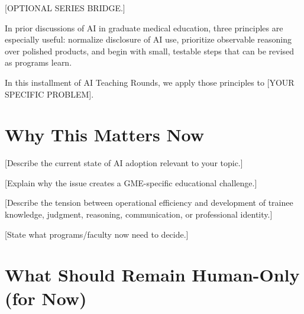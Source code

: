 \documentclass[12pt]{article}
\begin{document}
 [OPTIONAL SERIES BRIDGE.]

In prior discussions of AI in graduate medical education, three principles
are especially useful: normalize disclosure of AI use, prioritize observable
reasoning over polished products, and begin with small, testable steps that
can be revised as programs learn.

In this installment of AI Teaching Rounds, we apply those principles to
	[YOUR SPECIFIC PROBLEM].


\section*{Why This Matters Now}


 [Describe the current state of AI adoption relevant to your topic.]

 [Explain why the issue creates a GME-specific educational challenge.]

 [Describe the tension between operational efficiency and development of
  trainee knowledge, judgment, reasoning, communication, or professional
  identity.]

 [State what programs/faculty now need to decide.]


\section*{What Should Remain Human-Only (for Now)}

\end{document}
